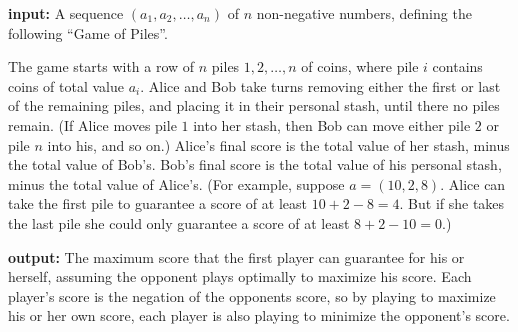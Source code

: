 \documentclass[11pt]{article}
\begin{document}
\noindent\textbf{input:} A sequence $(a_1, a_2, \ldots, a_n)$ of $n$ non-negative numbers, defining the following ``Game of Piles''.

  The game starts with a row of $n$ piles $1,2,\ldots,n$ of coins, where pile $i$
  contains coins of total value $a_i$.
  Alice and Bob take turns removing either the first or last of the remaining piles, and placing it in their personal stash, until there no piles remain.
  (If Alice moves pile $1$ into her stash, then Bob can move either pile $2$ or pile $n$ into his, and so on.)
  Alice's final score is the total value of her stash, minus the total value of Bob's.
  Bob's final score is the total value of his personal stash, minus the total value of Alice's.
  (For example, suppose $a=(10, 2, 8)$.  Alice can take the first pile to guarantee a score of at least $10 + 2 - 8 = 4$.
  But if she takes the last pile she could only guarantee a score of at least $8 + 2 - 10 = 0$.)

\noindent\textbf{output:}
The maximum score that the first player can guarantee for his or herself,
assuming the opponent plays optimally to maximize his score.
Each player's score is the negation of the opponents score, so by playing to maximize his or her own score, each player is also playing to minimize the opponent's score.
\end{document}

